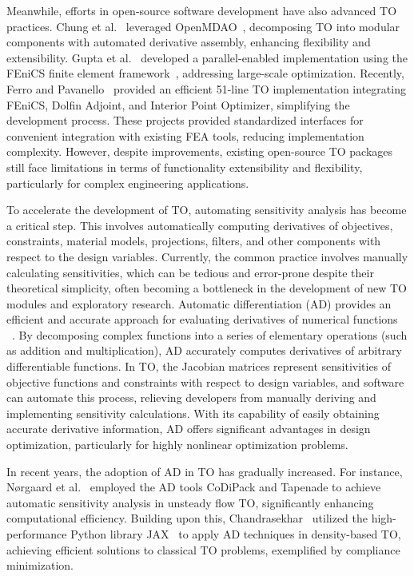 \documentclass[mathpazo]{cicp}
\begin{document}
Meanwhile, efforts in open-source software development have also advanced TO practices. Chung et al.~\cite{chung2019topology} leveraged OpenMDAO~\cite{gray2019openmdao}, decomposing TO into modular components with automated derivative assembly, enhancing flexibility and extensibility. Gupta et al.~\cite{gupta202055} developed a parallel-enabled implementation using the FEniCS finite element framework~\cite{alnaes2015fenics}, addressing large-scale optimization. Recently, Ferro and Pavanello~\cite{ferro2023simple} provided an efficient 51-line TO implementation integrating FEniCS, Dolfin Adjoint, and Interior Point Optimizer, simplifying the development process. These projects provided standardized interfaces for convenient integration with existing FEA tools, reducing implementation complexity. However, despite improvements, existing open-source TO packages still face limitations in terms of functionality extensibility and flexibility, particularly for complex engineering applications.

To accelerate the development of TO, automating sensitivity analysis has become a critical step. This involves automatically computing derivatives of objectives, constraints, material models, projections, filters, and other components with respect to the design variables. Currently, the common practice involves manually calculating sensitivities, which can be tedious and error-prone despite their theoretical simplicity, often becoming a bottleneck in the development of new TO modules and exploratory research. Automatic differentiation (AD) provides an efficient and accurate approach for evaluating derivatives of numerical functions ~\cite{griewank2008evaluating}. By decomposing complex functions into a series of elementary operations (such as addition and multiplication), AD accurately computes derivatives of arbitrary differentiable functions. In TO, the Jacobian matrices represent sensitivities of objective functions and constraints with respect to design variables, and software can automate this process, relieving developers from manually deriving and implementing sensitivity calculations. With its capability of easily obtaining accurate derivative information, AD offers significant advantages in design optimization, particularly for highly nonlinear optimization problems.

In recent years, the adoption of AD in TO has gradually increased. For instance, Nørgaard et al.~\cite{norgaard2017applications} employed the AD tools CoDiPack and Tapenade to achieve automatic sensitivity analysis in unsteady flow TO, significantly enhancing computational efficiency. Building upon this, Chandrasekhar~\cite{chandrasekhar2021auto} utilized the high-performance Python library JAX~\cite{bradbury2018jax} to apply AD techniques in density-based TO, achieving efficient solutions to classical TO problems, exemplified by compliance minimization.
\end{document}

